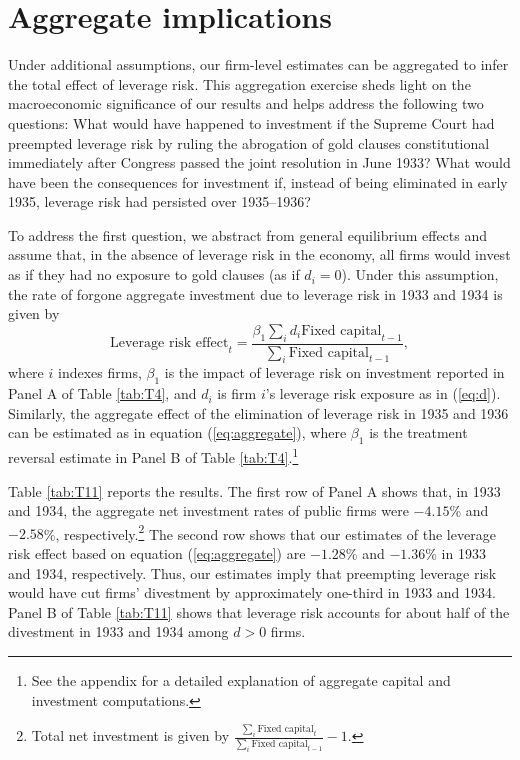 \section{Aggregate implications}
\label{sec:aggregate_implications}

\noindent Under additional assumptions, our firm-level estimates can be aggregated to infer the total effect of leverage risk. This aggregation exercise sheds light on the macroeconomic significance of our results and helps address the following two questions: What would have happened to investment if the Supreme Court had preempted leverage risk by ruling the abrogation of gold clauses constitutional immediately after Congress passed the joint resolution in June 1933? What would have been the consequences for investment if, instead of being eliminated in early 1935, leverage risk had persisted over 1935--1936?
	
To address the first question, we abstract from general equilibrium effects and assume that, in the absence of leverage risk in the economy, all firms would invest as if they had no exposure to gold clauses (as if $d_i = 0$). Under this assumption, the rate of forgone aggregate investment due to leverage risk in 1933 and 1934 is given by
\begin{equation}
\label{eq:aggregate}
\text{Leverage risk effect}_t = \frac{\beta_1 \sum_i d_i \text{Fixed capital}_{t-1}}{\sum_i \text{Fixed capital}_{t-1}},
\end{equation}
where $i$ indexes firms, $\beta_1$ is the impact of leverage risk on investment reported in Panel A of Table \ref{tab:T4}, and $d_i$ is firm $i$'s leverage risk exposure as in (\ref{eq:d}). Similarly, the aggregate effect of the elimination of leverage risk in 1935 and 1936 can be estimated as in equation (\ref{eq:aggregate}), where $\beta_1$ is the treatment reversal estimate in Panel B of Table \ref{tab:T4}.\footnote{See the appendix for a detailed explanation of aggregate capital and investment computations.}

Table \ref{tab:T11} reports the results. The first row of Panel A shows that, in 1933 and 1934, the aggregate net investment rates of public firms were $-4.15$\% and $-2.58$\%, respectively.\footnote{Total net investment is given by $\frac{\sum_i \text{Fixed capital}_{t}}{\sum_i \text{Fixed capital}_{t-1}} - 1$.} The second row shows that our estimates of the leverage risk effect based on equation (\ref{eq:aggregate}) are $-1.28$\% and $-1.36$\% in 1933 and 1934, respectively. Thus, our estimates imply that preempting leverage risk would have cut firms' divestment by approximately one-third in 1933 and 1934. Panel B of Table \ref{tab:T11} shows that leverage risk accounts for about half of the divestment in 1933 and 1934 among $d > 0$ firms.

